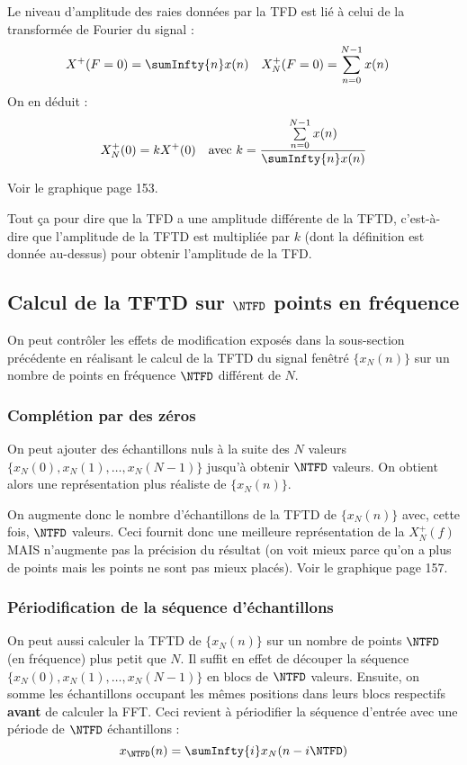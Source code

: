                 Le niveau d'amplitude des raies données par la TFD est lié à celui de la transformée de Fourier du signal :
                \begin{align*}
                    X^+(F = 0) &= \sumInfty{n} x(n) & X_N^+(F = 0) &= \sum_{n=0}^{N-1} x(n)
                \end{align*}
                On en déduit :
                \begin{align*}
                    X_N^+(0) &= kX^+(0) &\text{avec } k = \frac{\sum\limits_{n=0}^{N-1} x(n)}{\sumInfty{n} x(n)}
                \end{align*}

                Voir le graphique page 153.

                Tout ça pour dire que la TFD a une amplitude différente de la TFTD, c'est-à-dire que l'amplitude de la TFTD est multipliée par $k$ (dont la définition est donnée au-dessus) pour obtenir l'amplitude de la TFD.

        \subsection{Calcul de la TFTD sur $\NTFD$ points en fréquence}
            On peut contrôler les effets de modification exposés dans la sous-section précédente en réalisant le calcul de la TFTD du signal fenêtré $\{x_N(n)\}$ sur un nombre de points en fréquence $\NTFD$\index{$\NTFD$} différent de $N$.

            \subsubsection{Complétion par des zéros}
                On peut ajouter des échantillons nuls à la suite des $N$ valeurs $\{x_N(0), x_N(1), \dots, x_N(N-1)\}$ jusqu'à obtenir $\NTFD$ valeurs. On obtient alors une représentation plus réaliste de $\{x_N(n)\}$.

                On augmente donc le nombre d'échantillons de la TFTD de $\{x_N(n)\}$ avec, cette fois, $\NTFD$ valeurs. Ceci fournit donc une meilleure représentation de la $X_N^+(f)$ MAIS n'augmente pas la précision du résultat (on voit mieux parce qu'on a plus de points mais les points ne sont pas mieux placés). Voir le graphique page 157.

            \subsubsection{Périodification de la séquence d'échantillons}
                On peut aussi calculer la TFTD de $\{x_N(n)\}$ sur un nombre de points $\NTFD$ (en fréquence) plus petit que $N$. Il suffit en effet de découper la séquence $\{x_N(0), x_N(1), \dots, x_N(N-1)\}$ en blocs de $\NTFD$ valeurs. Ensuite, on somme les échantillons occupant les mêmes positions dans leurs blocs respectifs \textbf{avant} de calculer la FFT. Ceci revient à périodifier la séquence d'entrée avec une période de $\NTFD$ échantillons :
                $$
                    x_{\NTFD}(n) = \sumInfty{i} x_N(n-i \NTFD)
                $$
                
